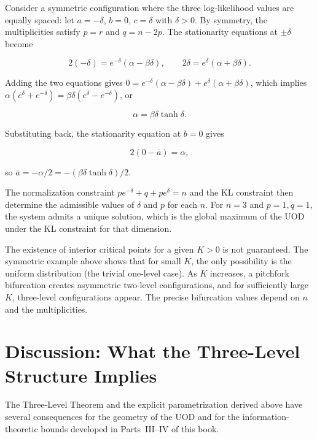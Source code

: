\begin{example}
\label{ch:ex:three-level-symmetric}
Consider a symmetric configuration where the three log-likelihood values
are equally spaced: let \(a=-\delta\), \(b=0\), \(c=\delta\) with
\(\delta>0\).  By symmetry, the multiplicities satisfy \(p=r\) and
\(q=n-2p\).  The stationarity equations at \(\pm\delta\) become

\[
2(-\delta) = e^{-\delta}(\alpha-\beta\delta),\qquad
2\delta = e^{\delta}(\alpha+\beta\delta).
\]

Adding the two equations gives
\(0 = e^{-\delta}(\alpha-\beta\delta) + e^{\delta}(\alpha+\beta\delta)\),
which implies \(\alpha(e^{\delta}+e^{-\delta}) = \beta\delta(e^{\delta}-e^{-\delta})\), or

\[
\alpha = \beta\delta\tanh\delta.
\]

Substituting back, the stationarity equation at \(b=0\) gives

\[
2(0-\bar a) = \alpha,
\]

so \(\bar a = -\alpha/2 = -(\beta\delta\tanh\delta)/2\).

The normalization constraint \(p e^{-\delta} + q + p e^{\delta} = n\) and
the KL constraint then determine the admissible values of \(\delta\)
and \(p\) for each \(n\).  For \(n=3\) and \(p=1,q=1\), the system
admits a unique solution, which is the global maximum of the UOD under
the KL constraint for that dimension.
\end{example}

\begin{remark}
\label{rem:three-level-existence}
The existence of interior critical points for a given \(K>0\) is not
guaranteed.  The symmetric example above shows that for small \(K\),
the only possibility is the uniform distribution (the trivial
one-level case).  As \(K\) increases, a pitchfork bifurcation creates
asymmetric two-level configurations, and for sufficiently large \(K\),
three-level configurations appear.  The precise bifurcation values
depend on \(n\) and the multiplicities.
\end{remark}

\section{Discussion: What the Three-Level Structure Implies}

The Three-Level Theorem and the explicit parametrization derived above
have several consequences for the geometry of the UOD and for the
information-theoretic bounds developed in Parts~III--IV of this book.


